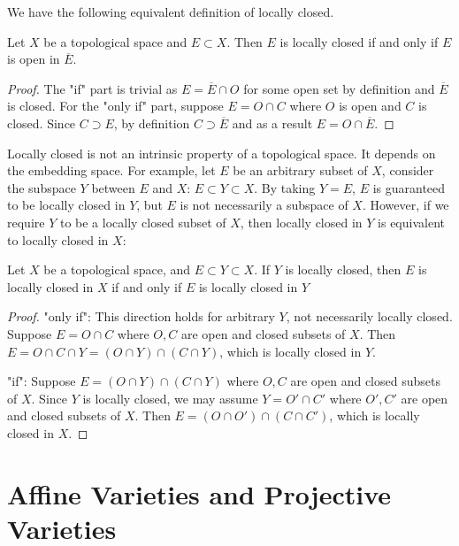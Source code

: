 \documentclass{note-eng}
\begin{document}
We have the following equivalent definition of locally closed.

\begin{proposition}\label{prop:locally-closed-equiv-def}
    Let $X$ be a topological space and $E \subset X$. Then $E$ is locally closed if and only if $E$ is open in $\overline{E}$.
\end{proposition}

\begin{proof}
    The "if" part is trivial as $E = \overline{E} \cap O$ for some open set by definition and $\overline{E}$ is closed. For the "only if" part, suppose $E = O \cap C$ where $O$ is open and $C$ is closed. Since $C \supset E$, by definition $C \supset \overline{E}$ and as a result $E = O \cap \overline{E}$.
\end{proof}

Locally closed is not an intrinsic property of a topological space. It depends on the embedding space. For example, let $E$ be an arbitrary subset of $X$, consider the subspace $Y$ between $E$ and $X$: $E \subset Y \subset X$. By taking $Y = E$, $E$ is guaranteed to be locally closed in $Y$, but $E$ is not necessarily a subspace of $X$. However, if we require $Y$ to be a locally closed subset of $X$, then locally closed in $Y$ is equivalent to locally closed in $X$:

\begin{proposition}\label{prop:locally-closed-transitive}
    Let $X$ be a topological space, and $E \subset Y \subset X$. If $Y$ is locally closed, then $E$ is locally closed in $X$ if and only if $E$ is locally closed in $Y$
\end{proposition}

\begin{proof}
    "only if": This direction holds for arbitrary $Y$, not necessarily locally closed. Suppose $E = O \cap C$ where $O, C$ are open and closed subsets of $X$. Then $E = O \cap C \cap Y = (O \cap Y) \cap (C \cap Y)$, which is locally closed in $Y$.

    "if": Suppose $E = (O \cap Y) \cap (C \cap Y)$ where $O, C$ are open and closed subsets of $X$. Since $Y$ is locally closed, we may assume $Y = O' \cap C'$ where $O', C'$ are open and closed subsets of $X$. Then $E = (O \cap O') \cap (C \cap C')$, which is locally closed in $X$.
\end{proof}

\section{Affine Varieties and Projective Varieties}
\end{document}
